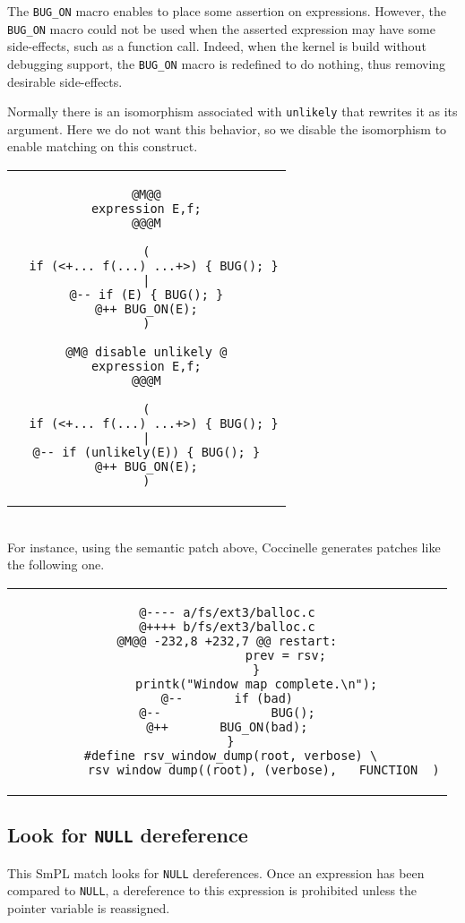 \newpage

The \texttt{BUG\_ON} macro enables to place some assertion on
expressions. However, the \texttt{BUG\_ON} macro could not be used
when the asserted expression may have some side-effects, such as a
function call. Indeed, when the kernel is build without debugging
support, the \texttt{BUG\_ON} macro is redefined to do nothing,
thus removing desirable side-effects.

Normally there is an isomorphism associated with \texttt{unlikely} that
rewrites it as its argument. Here we do not want this behavior, so we
disable the isomorphism to enable matching on this construct.\\

\begin{tabular}{c}
\begin{lstlisting}[language=Cocci,name=bugon]
@M@@
expression E,f;
@@@M

(
  if (<+... f(...) ...+>) { BUG(); }
|
@-- if (E) { BUG(); }
@++ BUG_ON(E);
)

@M@ disable unlikely @
expression E,f;
@@@M

(
  if (<+... f(...) ...+>) { BUG(); }
|
@-- if (unlikely(E)) { BUG(); }
@++ BUG_ON(E);
)
\end{lstlisting}\\
\end{tabular}\\

For instance, using the semantic patch above, Coccinelle generates
patches like the following one.

\begin{tabular}{c}
\begin{lstlisting}[language=PatchC]
@---- a/fs/ext3/balloc.c
@++++ b/fs/ext3/balloc.c
@M@@ -232,8 +232,7 @@ restart:
                prev = rsv;
        }
        printk("Window map complete.\n");
@--       if (bad)
@--               BUG();
@++       BUG_ON(bad);
 }
 #define rsv_window_dump(root, verbose) \
        __rsv_window_dump((root), (verbose), __FUNCTION__)
\end{lstlisting}
\end{tabular}

\newpage
\subsection{Look for \texttt{NULL} dereference}

This SmPL match looks for \texttt{NULL} dereferences. Once an
expression has been compared to \texttt{NULL}, a dereference to this
expression is prohibited unless the pointer variable is reassigned.\\

